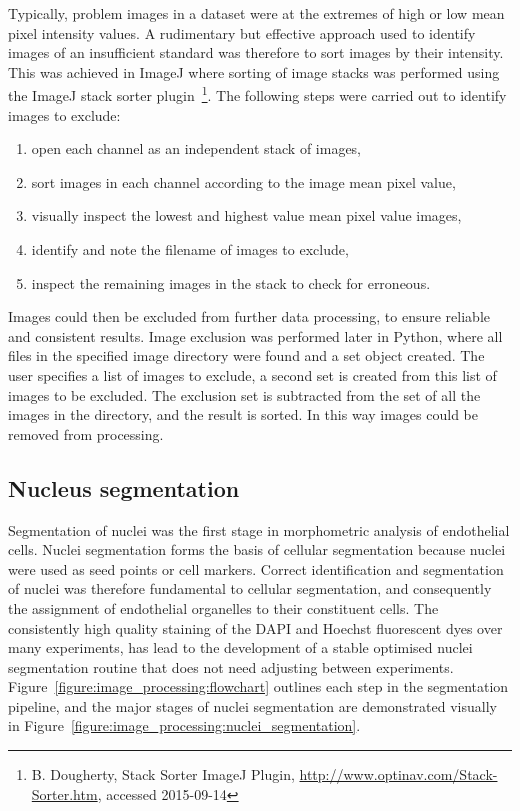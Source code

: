 Typically, problem images in a dataset were at the extremes of high or low mean pixel intensity values. A rudimentary but effective approach used to identify images of an insufficient standard was therefore to sort images by their intensity. This was achieved in ImageJ where sorting of image stacks was performed using the ImageJ stack sorter plugin~\footnote{B. Dougherty, Stack Sorter ImageJ Plugin, \url{http://www.optinav.com/Stack-Sorter.htm}, accessed 2015-09-14}. The following steps were carried out to identify images to exclude:

\begin{enumerate}\setlength\itemsep{0pt}
	\item open each channel as an independent stack of images,
	\item sort images in each channel according to the image mean pixel value,
	\item visually inspect the lowest and highest value mean pixel value images,
	\item identify and note the filename of images to exclude,
	\item inspect the remaining images in the stack to check for erroneous.
\end{enumerate}
Images could then be excluded from further data processing, to ensure reliable and consistent results. Image exclusion was performed later in Python, where all files in the specified image directory were found and a set object created. The user specifies a list of images to exclude, a second set is created from this list of images to be excluded. The exclusion set is subtracted from the set of all the images in the directory, and the result is sorted. In this way images could be removed from processing.

\subsection{Nucleus segmentation}
\label{endothelial_morphometry:image_processing:nuclei}
Segmentation of nuclei was the first stage in morphometric analysis of endothelial cells. Nuclei segmentation forms the basis of cellular segmentation because nuclei were used as seed points or cell markers. Correct identification and segmentation of nuclei was therefore fundamental to cellular segmentation, and consequently the assignment of endothelial organelles to their constituent cells. The consistently high quality staining of the DAPI and Hoechst fluorescent dyes over many experiments, has lead to the development of a stable optimised nuclei segmentation routine that does not need adjusting between experiments. Figure~\ref{figure:image_processing:flowchart} outlines each step in the segmentation pipeline, and the major stages of nuclei segmentation are demonstrated visually in Figure~\ref{figure:image_processing:nuclei_segmentation}.

